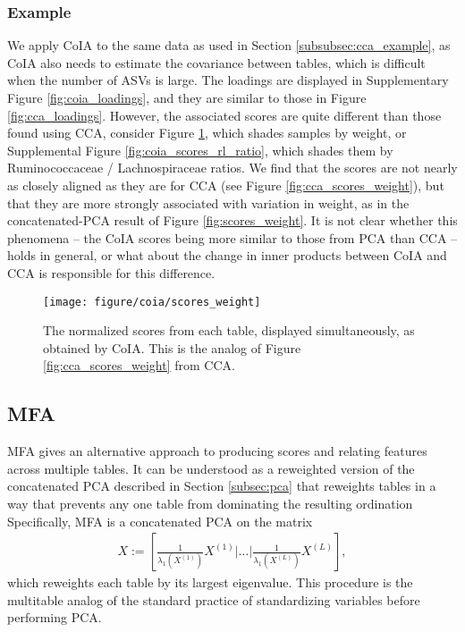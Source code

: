 \documentclass{article}
\begin{document}
\subsubsection{Example}
\label{subsubsec:coia_example}

We apply CoIA to the same data as used in Section \ref{subsubsec:cca_example},
as CoIA also needs to estimate the covariance between tables, which is difficult
when the number of ASVs is large. The loadings are displayed in Supplementary
Figure \ref{fig:coia_loadings}, and they are similar to those in Figure
\ref{fig:cca_loadings}. However, the associated scores are quite
different than those found using CCA, consider Figure
\ref{fig:coia_scores_weight}, which shades samples by weight, or
Supplemental Figure \ref{fig:coia_scores_rl_ratio}, which shades them by
Ruminococcaceae / Lachnospiraceae ratios. We find that the scores are not nearly as
closely aligned as they are for CCA (see Figure \ref{fig:cca_scores_weight}), but
that they are more strongly associated with variation in weight, as in the
concatenated-PCA result of Figure \ref{fig:scores_weight}. It is not
clear whether this phenomena -- the CoIA scores being more similar to those from
PCA than CCA -- holds in general, or what about the change in inner products
between CoIA and CCA is responsible for this difference.

\begin{figure}[ht]
  \centering
  \texttt{[image: figure/coia/scores\_weight]}
  \caption{The normalized scores from each table, displayed
    simultaneously, as obtained by CoIA. This is the analog of Figure
    \ref{fig:cca_scores_weight} from CCA. \label{fig:coia_scores_weight} }
\end{figure}


\subsection{MFA}
\label{subsec:mfa}

MFA gives an alternative approach to producing scores and relating features
across multiple tables\citep{pages2014multiple}. It can be understood as a
reweighted version of the concatenated PCA described in Section \ref{subsec:pca}
that reweights tables in a way that prevents any one table from dominating the
resulting ordination Specifically, MFA is a concatenated PCA on the matrix
\begin{align*}
X := \left[\frac{1}{\lambda_{1}\left(X^{(1)}\right)}X^{(1)} \vert \dots
  \vert \frac{1}{\lambda_{1}\left(X^{(L)}\right)}X^{(L)}\right],
\end{align*}
which reweights each table by its largest eigenvalue. This procedure is the
multitable analog of the standard practice of standardizing variables before
performing PCA.
\end{document}
